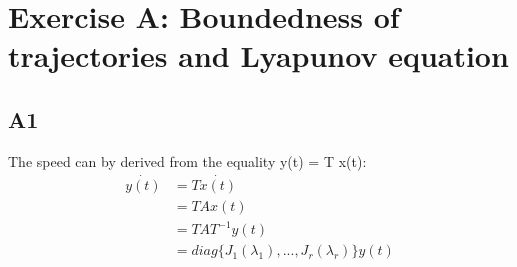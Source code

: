 \documentclass[11pt]{article}
\begin{document}
\section*{Exercise A: Boundedness of trajectories and Lyapunov equation}
\subsection*{A1}
The speed can by derived from the equality y(t) = T x(t):
\begin{align*}
    \Dot{y(t)} &= T \Dot{x(t)} \\
    &= T A x(t) \\
    &= T A T^{-1} y(t) \\
    &= diag\{J_1(\lambda_1), ..., J_r(\lambda_r)\} y(t)
\end{align*}
\end{document}
